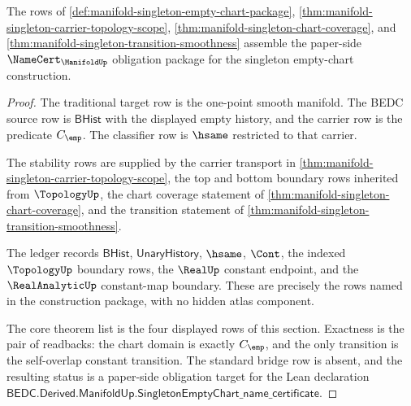 \begin{theorem}
\label{thm:manifold-singleton-namecert-obligation-package}
The rows of
\autoref{def:manifold-singleton-empty-chart-package},
\autoref{thm:manifold-singleton-carrier-topology-scope},
\autoref{thm:manifold-singleton-chart-coverage}, and
\autoref{thm:manifold-singleton-transition-smoothness} assemble the
paper-side $\NameCert_{\ManifoldUp}$ obligation package for the singleton
empty-chart construction.
\end{theorem}
\begin{proof}
The traditional target row is the one-point smooth manifold. The BEDC source
row is $\mathsf{BHist}$ with the displayed empty history, and the carrier row
is the predicate $C_{\emp}$. The classifier row is $\hsame$ restricted to that
carrier.

The stability rows are supplied by the carrier transport in
\autoref{thm:manifold-singleton-carrier-topology-scope}, the top and bottom
boundary rows inherited from $\TopologyUp$, the chart coverage statement of
\autoref{thm:manifold-singleton-chart-coverage}, and the transition statement
of \autoref{thm:manifold-singleton-transition-smoothness}.

The ledger records $\mathsf{BHist}$, $\mathsf{UnaryHistory}$, $\hsame$,
$\Cont$, the indexed $\TopologyUp$ boundary rows, the $\RealUp$ constant
endpoint, and the $\RealAnalyticUp$ constant-map boundary. These are precisely
the rows named in the construction package, with no hidden atlas component.

The core theorem list is the four displayed rows of this section. Exactness is
the pair of readbacks: the chart domain is exactly $C_{\emp}$, and the only
transition is the self-overlap constant transition. The standard bridge row is
absent, and the resulting status is a paper-side obligation target for the
Lean declaration
$\mathsf{BEDC.Derived.ManifoldUp.SingletonEmptyChart\_name\_certificate}$.
\end{proof}

